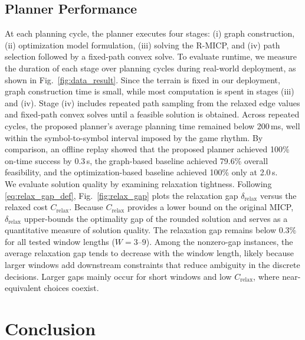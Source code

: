 \documentclass[letterpaper, 10 pt, journal, twoside]{IEEEtran}
\begin{document}
\subsection{Planner Performance}
At each planning cycle, the planner executes four stages: (i) graph construction, (ii) optimization model formulation, (iii) solving the R-MICP, and (iv) path selection followed by a fixed-path convex solve.
To evaluate runtime, we measure the duration of each stage over planning cycles during real-world deployment, as shown in Fig.~\ref{fig:data_result}.
Since the terrain is fixed in our deployment, graph construction time is small, while most computation is spent in stages (iii) and (iv).
Stage (iv) includes repeated path sampling from the relaxed edge values and fixed-path convex solves until a feasible solution is obtained.
Across repeated cycles, the proposed planner's average planning time remained below 200\,ms, well within the symbol-to-symbol interval imposed by the game rhythm.
By comparison, an offline replay showed that the proposed planner achieved 100\% on-time success by 0.3\,s, the graph-based baseline achieved 79.6\% overall feasibility, and the optimization-based baseline achieved 100\% only at 2.0\,s.
\\
\indent
We evaluate solution quality by examining relaxation tightness.
Following \eqref{eq:relax_gap_def}, Fig.~\ref{fig:relax_gap} plots the relaxation gap $\delta_{\mathrm{relax}}$ versus the relaxed cost $C_{\mathrm{relax}}$.
Because $C_{\mathrm{relax}}$ provides a lower bound on the original MICP, $\delta_{\mathrm{relax}}$ upper-bounds the optimality gap of the rounded solution and serves as a quantitative measure of solution quality.
The relaxation gap remains below $0.3\%$ for all tested window lengths ($W=3$--$9$).
Among the nonzero-gap instances, the average relaxation gap tends to decrease with the window length, likely because larger windows add downstream constraints that reduce ambiguity in the discrete decisions.
Larger gaps mainly occur for short windows and low $C_{\mathrm{relax}}$, where near-equivalent choices coexist.


\section{Conclusion}
\end{document}
